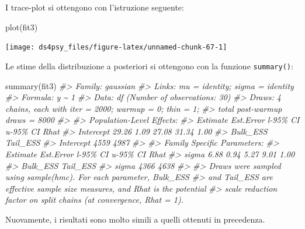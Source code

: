 \documentclass[
  11pt,
]{krantz}
\makeatletter
\newenvironment{Shaded}{\begin{snugshade}}{\end{snugshade}}
\newcommand{\CommentTok}[1]{\textcolor[rgb]{0.37,0.37,0.37}{\textit{#1}}}
\newcommand{\FunctionTok}[1]{\textcolor[rgb]{0,0,0}{#1}}
\newcommand{\NormalTok}[1]{#1}
\newenvironment{kframe}{%
\medskip{}
\setlength{\fboxsep}{.8em}
 \def\at@end@of@kframe{}%
 \ifinner\ifhmode%
  \def\at@end@of@kframe{\end{minipage}}%
  \begin{minipage}{\columnwidth}%
 \fi\fi%
 \def\FrameCommand##1{\hskip\@totalleftmargin \hskip-\fboxsep
 \colorbox{shadecolor}{##1}\hskip-\fboxsep
     \hskip-\linewidth \hskip-\@totalleftmargin \hskip\columnwidth}%
 \MakeFramed {\advance\hsize-\width
   \@totalleftmargin\z@ \linewidth\hsize
   \@setminipage}}%
 {\par\unskip\endMakeFramed%
 \at@end@of@kframe}
\renewenvironment{Shaded}{\begin{kframe}}{\end{kframe}}
\theoremstyle{definition}
\theoremstyle{definition}
\theoremstyle{definition}
\theoremstyle{definition}
\theoremstyle{remark}
\makeatother
\begin{document}
I trace-plot si ottengono con l'istruzione seguente:

\begin{Shaded}
\begin{Highlighting}[]
\FunctionTok{plot}\NormalTok{(fit3)}
\end{Highlighting}
\end{Shaded}

\begin{center}\texttt{[image: ds4psy\_files/figure-latex/unnamed-chunk-67-1]} \end{center}

Le stime della distribuzione a posteriori si ottengono con la funzione \texttt{summary()}:

\begin{Shaded}
\begin{Highlighting}[]
\FunctionTok{summary}\NormalTok{(fit3)}
\CommentTok{\#\textgreater{}  Family: gaussian }
\CommentTok{\#\textgreater{}   Links: mu = identity; sigma = identity }
\CommentTok{\#\textgreater{} Formula: y \textasciitilde{} 1 }
\CommentTok{\#\textgreater{}    Data: df (Number of observations: 30) }
\CommentTok{\#\textgreater{}   Draws: 4 chains, each with iter = 2000; warmup = 0; thin = 1;}
\CommentTok{\#\textgreater{}          total post{-}warmup draws = 8000}
\CommentTok{\#\textgreater{} }
\CommentTok{\#\textgreater{} Population{-}Level Effects: }
\CommentTok{\#\textgreater{}           Estimate Est.Error l{-}95\% CI u{-}95\% CI Rhat}
\CommentTok{\#\textgreater{} Intercept    29.26      1.09    27.08    31.34 1.00}
\CommentTok{\#\textgreater{}           Bulk\_ESS Tail\_ESS}
\CommentTok{\#\textgreater{} Intercept     4559     4987}
\CommentTok{\#\textgreater{} }
\CommentTok{\#\textgreater{} Family Specific Parameters: }
\CommentTok{\#\textgreater{}       Estimate Est.Error l{-}95\% CI u{-}95\% CI Rhat}
\CommentTok{\#\textgreater{} sigma     6.88      0.94     5.27     9.01 1.00}
\CommentTok{\#\textgreater{}       Bulk\_ESS Tail\_ESS}
\CommentTok{\#\textgreater{} sigma     4366     4638}
\CommentTok{\#\textgreater{} }
\CommentTok{\#\textgreater{} Draws were sampled using sample(hmc). For each parameter, Bulk\_ESS}
\CommentTok{\#\textgreater{} and Tail\_ESS are effective sample size measures, and Rhat is the potential}
\CommentTok{\#\textgreater{} scale reduction factor on split chains (at convergence, Rhat = 1).}
\end{Highlighting}
\end{Shaded}

Nuovamente, i risultati sono molto simili a quelli ottenuti in precedenza.
\end{document}
